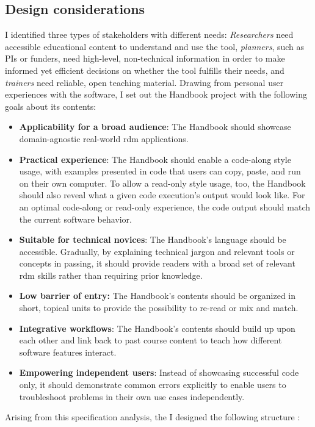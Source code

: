 \subsection{Design considerations}
I identified three types of stakeholders with different needs: \textit{Researchers} need accessible educational content to understand and use the tool, \textit{planners}, such as PIs or funders, need high-level, non-technical information in order to make informed yet efficient decisions on whether the tool fulfills their needs, and \textit{trainers} need reliable, open teaching material.
Drawing from personal user experiences with the software, I set out the Handbook project with the following goals about its contents:

\begin{itemize}
	\item \textbf{Applicability for a broad audience}: The Handbook should showcase domain-agnostic real-world \gls{rdm} applications.
	\item \textbf{Practical experience}: The Handbook should enable a code-along style usage, with examples presented in code that users can copy, paste, and run on their own computer. To allow a read-only style usage, too, the Handbook should also reveal what a given code execution's output would look like. For an optimal code-along or read-only experience, the code output should match the current software behavior.
	\item \textbf{Suitable for technical novices}: The Handbook's language should be accessible. Gradually, by explaining technical jargon and relevant tools or concepts in passing, it should provide readers with a broad set of relevant \gls{rdm} skills rather than requiring prior knowledge.
	\item \textbf{Low barrier of entry:} The Handbook's contents should be organized in short, topical units to provide the possibility to re-read or mix and match.
	\item \textbf{Integrative workflows}: The Handbook's contents should build up upon each other and link back to past course content to teach how different software features interact.
	\item \textbf{Empowering independent users}: Instead of showcasing successful code only, it should demonstrate common errors explicitly to enable users to troubleshoot problems in their own use cases independently.

\end{itemize}

Arising from this specification analysis, the I designed the following structure \citep{wagner_adina_s_2020_7906718}:

